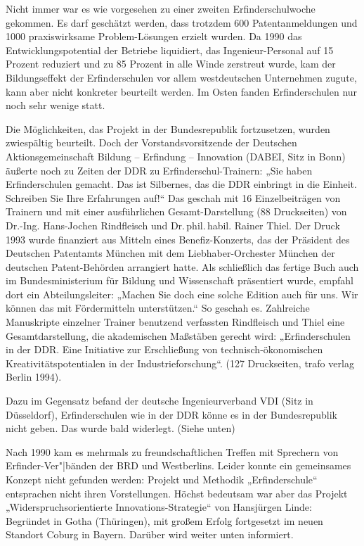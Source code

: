 \documentclass[12pt,a4paper]{article}
\begin{document}
Nicht immer war es wie vorgesehen zu einer zweiten Erfinderschulwoche gekommen.
Es darf geschätzt werden, dass trotzdem 600 Patentanmeldungen und 1000
praxiswirksame Problem-Lösungen erzielt wurden. Da 1990 das
Entwicklungspotential der Betriebe liquidiert, das Ingenieur-Personal auf 15
Prozent reduziert und zu 85 Prozent in alle Winde zerstreut wurde, kam der
Bildungseffekt der Erfinderschulen vor allem westdeutschen Unternehmen zugute,
kann aber nicht konkreter beurteilt werden. Im Osten fanden Erfinderschulen nur
noch sehr wenige statt.

Die Möglichkeiten, das Projekt in der Bundesrepublik fortzusetzen, wurden
zwiespältig beurteilt. Doch der Vorstandsvorsitzende der Deutschen
Aktionsgemeinschaft Bildung – Erfindung – Innovation (DABEI, Sitz in Bonn)
äußerte noch zu Zeiten der DDR zu Erfinderschul-Trainern: „Sie haben
Erfinderschulen gemacht. Das ist Silbernes, das die DDR einbringt in die
Einheit.  Schreiben Sie Ihre Erfahrungen auf!“ Das geschah mit 16
Einzelbeiträgen von Trainern und mit einer ausführlichen Gesamt-Darstellung (88
Druckseiten) von Dr.-Ing. Hans-Jochen Rindfleisch und Dr.\,phil.\,habil. Rainer
Thiel.  Der Druck 1993 wurde finanziert aus Mitteln eines Benefiz-Konzerts, das
der Präsident des Deutschen Patentamts München mit dem Liebhaber-Orchester
München der deutschen Patent-Behörden arrangiert hatte. Als schließlich das
fertige Buch auch im Bundesministerium für Bildung und Wissenschaft präsentiert
wurde, empfahl dort ein Abteilungsleiter: „Machen Sie doch eine solche Edition
auch für uns. Wir können das mit Fördermitteln unterstützen.“ So geschah es.
Zahlreiche Manuskripte einzelner Trainer benutzend verfassten Rindfleisch und
Thiel eine Gesamtdarstellung, die akademischen Maßstäben gerecht wird:
„Erfinderschulen in der DDR. Eine Initiative zur Erschließung von
technisch-ökonomischen Kreativitätspotentialen in der Industrieforschung“. (127
Druckseiten, trafo verlag Berlin 1994).

Dazu im Gegensatz befand der deutsche Ingenieurverband VDI (Sitz in
Düsseldorf), Erfinderschulen wie in der DDR könne es in der Bundesrepublik
nicht geben. Das wurde bald widerlegt. (Siehe unten)

Nach 1990 kam es mehrmals zu freundschaftlichen Treffen mit Sprechern von
Erfinder-Ver"|bänden der BRD und Westberlins. Leider konnte ein gemeinsames
Konzept nicht gefunden werden: Projekt und Methodik „Erfinderschule“
entsprachen nicht ihren Vorstellungen. Höchst bedeutsam war aber das Projekt
„Widerspruchsorientierte Innovations-Strategie“ von Hansjürgen Linde: Begründet
in Gotha (Thüringen), mit großem Erfolg fortgesetzt im neuen Standort Coburg in
Bayern. Darüber wird weiter unten informiert.
\end{document}
